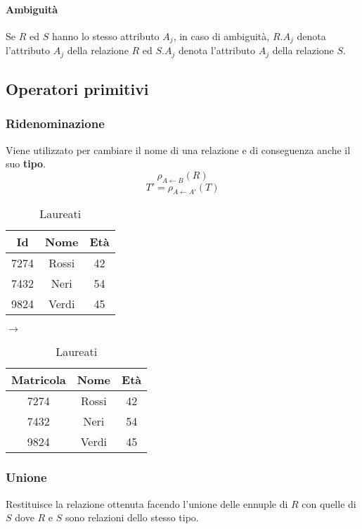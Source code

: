 \paragraph{Ambiguità} Se $R$ ed $S$ hanno lo stesso attributo $A_j$, in caso di ambiguità, $R.A_j$ denota l’attributo $A_j$ della relazione $R$ ed $S.A_j$ denota l’attributo $A_j$ della relazione $S$.

\newpage
\subsection{Operatori primitivi}
\subsubsection{Ridenominazione}
Viene utilizzato per cambiare il nome di una relazione e di conseguenza anche il suo \textbf{tipo}.
\begin{equation}
	\rho_{A \leftarrow B}(R)
\end{equation}
\begin{equation}
	T' = \rho_{A \leftarrow A'}(T)
\end{equation}
\begin{table}[!h]
	\centering
	\begin{tabular}{|c|c|c|}
		\hline
		\textbf{Id} & \textbf{Nome} & \textbf{Età} \\
		\hline
		7274 & Rossi & 42 \\
		\hline
		7432 & Neri & 54 \\
		\hline
		9824 & Verdi & 45 \\
		\hline
	\end{tabular}
	\hspace{10pt} $\longrightarrow$ \hspace{10pt}
	\begin{tabular}{|c|c|c|}
		\hline
		\textbf{Matricola} & \textbf{Nome} & \textbf{Età} \\
		\hline
		7274 & Rossi & 42 \\
		\hline
		7432 & Neri & 54 \\
		\hline
		9824 & Verdi & 45 \\
		\hline
	\end{tabular}
	\caption{Laureati}
\end{table}

\subsubsection{Unione}
Restituisce la relazione ottenuta facendo l’unione delle ennuple di $R$ con quelle di $S$ dove $R$ e $S$ sono relazioni dello stesso tipo.

